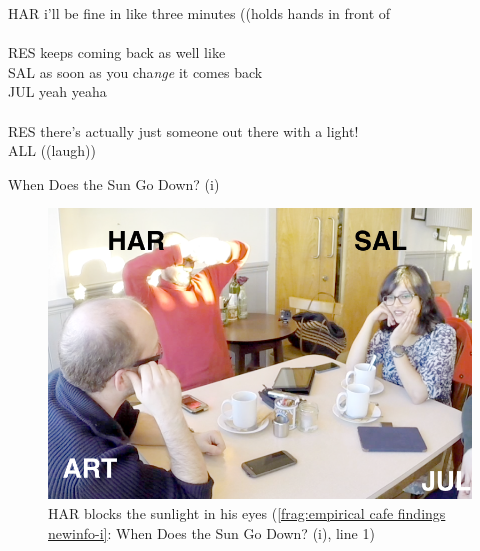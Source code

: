 \begin{revisedsubmission}
\begin{inlinefrag}
    {
    \begin{transcript}
        \by HAR {i’ll be fine in like three minutes ((holds hands in front of} \\
         \\
        \by RES {keeps coming back as well like} \\
        \by SAL {as soon as you cha\emph{nge} it comes back} \\
        \by JUL {yeah yeaha} \\
         \\
        \by RES {there’s actually just someone out there with a light!} \\
        \by ALL {((laugh))} \\
    \end{transcript}
    \caption{When Does the Sun Go Down? (i)}\label{frag:empirical cafe findings newinfo-i}
    \begin{figure}[bth]
        \centering
            \includegraphics[width=.7\linewidth]{Graphics/3-2-Empirical-Cafe/FragmentSunset-1}%
        \caption{HAR blocks the sunlight in his eyes (\autoref{frag:empirical cafe findings newinfo-i}: When Does the Sun Go Down? (i), line 1)}\label{fig:empirical cafe findings newinfo-i}
    \end{figure}
    }
\end{inlinefrag}


\end{revisedsubmission}
